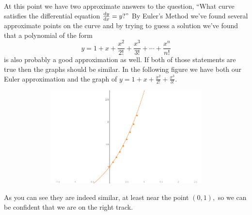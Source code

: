 


At this point we have two approximate answers to the question, ``What
curve satisfies the differential equation $\frac{\text{d}{y}}{\text{d}{x}}=y?"$ By Euler's
Method we've found several approximate points on the curve and by
trying to guess a solution we've found that a polynomial of the form
$$
y=1+x+\frac{x^2}{2!}+\frac{x^3}{3!}+ \cdots + \frac{x^n}{n!}
$$
is also probably a good approximation as well. If both of those
statements are true then the graphs should be similar. In the following
figure we have both our Euler approximation and the graph of
$y=1+x+\frac{x^2}{2!}+\frac{x^3}{3!}.$\\
\centerline{\includegraphics*[height=2in,width=6in]{Figures/ExpEulerCubic}}
As you can see they are indeed similar, at least near the point
$(0,1),$ so we can be confident that we are on the right track.

